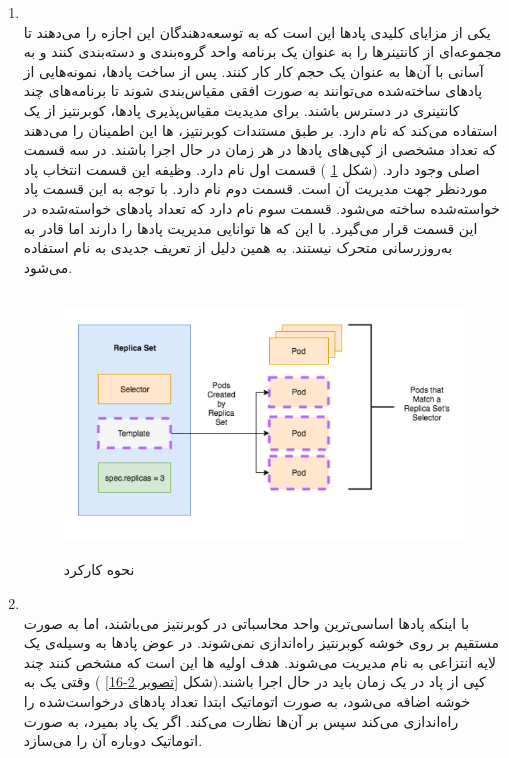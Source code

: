 \begin{enumerate}
	\item
	\\
	یکی از مزایای کلیدی پادها این است که به توسعه‌دهندگان این اجازه را می‌دهند تا مجموعه‌ای از کانتینرها را به عنوان یک برنامه واحد گروه‌بندی و دسته‌بندی کنند و به آسانی با آن‌ها به عنوان یک حجم کار  کار کنند. پس از ساخت پادها، نمونه‌هایی از پادهای ساخته‌شده می‌توانند به صورت افقی مقیاس‌بندی شوند تا برنامه‌های چند کانتینری در دسترس باشند. برای مدیدیت مقیاس‌پذیری پادها، کوبرنتیز از یک 
	استفاده می‌کند که 
	نام دارد.
	بر طبق مستندات کوبرنتیز، 
	ها این اطمینان را می‌دهند که تعداد مشخصی از کپی‌های پادها در هر زمان در حال اجرا باشند. 
	در 
	سه قسمت اصلی وجود دارد. (شکل
	\ref{تصویر 2-15}
	) قسمت اول 
	نام دارد. وظیفه این قسمت انتخاب پاد موردنظر جهت مدیریت آن است. قسمت دوم 
	نام دارد. 
	با توجه به این قسمت پاد خواسته‌شده ساخته می‌شود. قسمت سوم 
	نام دارد که تعداد پادهای خواسته‌شده در این قسمت قرار می‌گیرد. با این که  
	ها توانایی مدیریت پادها را دارند اما قادر به به‌روز‌رسانی متحرک نیستند. به همین دلیل از تعریف جدیدی به نام 
	استفاده می‌شود. 
	\cite{nirmata_ReplicaSetsAndDeployments}
	
	\begin{figure}[!h]
		\centering
		\includegraphics[height=7cm]{fig2-15}
		\caption{نحوه کارکرد 
		}
		\label{تصویر 2-15}
	\end{figure}
	
	\item
	\\
	با اینکه پادها اساسی‌ترین واحد محاسباتی در کوبرنتیز می‌باشند، اما به صورت مستقیم بر روی خوشه کوبرنتیز راه‌اندازی نمی‌شوند. در عوض پاد‌ها به وسیله‌ی یک لایه انتزاعی به نام 
	مدیریت می‌شوند. هدف اولیه 
	ها این است که مشخص کنند چند کپی از پاد در یک زمان باید در حال اجرا باشند.(شکل
	\ref{تصویر 2-16}
	) وقتی یک 
	به خوشه اضافه می‌شود، به صورت اتوماتیک ابتدا تعداد پادهای درخواست‌شده را راه‌اندازی می‌کند سپس بر آن‌ها نظارت می‌کند. اگر یک پاد بمیرد، 
	به صورت اتوماتیک دوباره آن را می‌سازد.
	

\end{enumerate}
